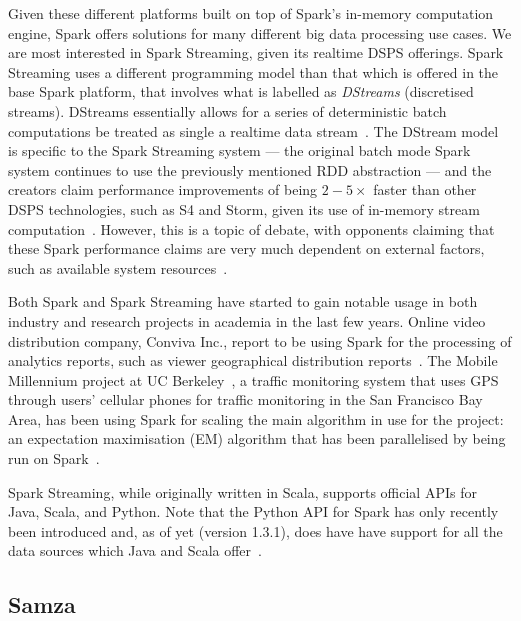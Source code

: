 Given these different platforms built on top of Spark's in-memory computation engine, Spark offers solutions for many
different big data processing use cases. We are most interested in Spark Streaming, given its realtime DSPS offerings.
Spark Streaming uses a different programming model than that which is offered in the base Spark platform, that involves what
is labelled as \textit{DStreams} (discretised streams). DStreams essentially allows for a series of deterministic batch computations
be treated as single a realtime data stream~\cite{zaharia2012discretized}. The DStream model is specific to the Spark Streaming
system --- the original batch mode Spark system continues to use the previously mentioned RDD abstraction --- and the
creators claim performance improvements of being $2-5\times$ faster than other DSPS technologies, such as S4
and Storm, given its use of in-memory stream computation~\cite{zaharia2013discretized}. However, this is a topic of debate,
with opponents claiming that these Spark performance claims are very much dependent on external factors, such as
available system resources~\cite{web_slideshare_b}.

Both Spark and Spark Streaming have started to gain notable usage in both industry and research projects in academia in
the last few years. Online video distribution company, Conviva Inc., report to be using Spark for the processing of
analytics reports, such as viewer geographical distribution reports~\cite{web_spark_conviva,zaharia2012fast}. The Mobile
Millennium project at UC Berkeley~\cite{web_spark_mmp}, a traffic monitoring system that uses GPS through users'
cellular phones for traffic monitoring in the San Francisco Bay Area, has been using Spark for scaling the main
algorithm in use for the project: an expectation maximisation (EM) algorithm that has been parallelised by being run on
Spark~\cite{hunter2011scaling}.

Spark Streaming, while originally written in Scala, supports official APIs for Java, Scala, and Python. Note that the
Python API for Spark has only recently been introduced and, as of yet (version 1.3.1), does have have support for all
the data sources which Java and Scala offer~\cite{Spark5:online}.



\subsection{Samza} %
\label{ssub:samza}

